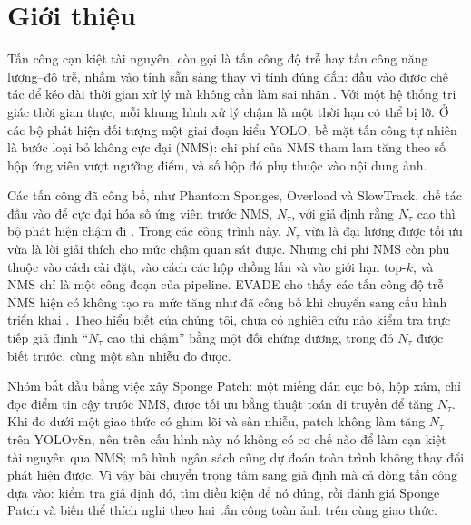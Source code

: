 \documentclass[a4paper,fleqn]{cas-dc}
\newcommand{\Ntau}{N_{\tau}}
\begin{document}
\section{Giới thiệu}
Tấn công cạn kiệt tài nguyên, còn gọi là tấn công độ trễ hay tấn công năng lượng--độ trễ, nhắm vào tính sẵn sàng thay vì tính đúng đắn: đầu vào được chế tác để kéo dài thời gian xử lý mà không cần làm sai nhãn \cite{shumailov2021sponge,nicgslowdown2022}. Với một hệ thống tri giác thời gian thực, mỗi khung hình xử lý chậm là một thời hạn có thể bị lỡ. Ở các bộ phát hiện đối tượng một giai đoạn kiểu YOLO, bề mặt tấn công tự nhiên là bước loại bỏ không cực đại (NMS): chi phí của NMS tham lam tăng theo số hộp ứng viên vượt ngưỡng điểm, và số hộp đó phụ thuộc vào nội dung ảnh.

Các tấn công đã công bố, như Phantom Sponges, Overload và SlowTrack, chế tác đầu vào để cực đại hóa số ứng viên trước NMS, $\Ntau$, với giả định rằng $\Ntau$ cao thì bộ phát hiện chậm đi \cite{phantom2023,overload2024,slowtrack2024}. Trong các công trình này, $\Ntau$ vừa là đại lượng được tối ưu vừa là lời giải thích cho mức chậm quan sát được. Nhưng chi phí NMS còn phụ thuộc vào cách cài đặt, vào cách các hộp chồng lấn và vào giới hạn top-$k$, và NMS chỉ là một công đoạn của pipeline. EVADE cho thấy các tấn công độ trễ NMS hiện có không tạo ra mức tăng như đã công bố khi chuyển sang cấu hình triển khai \cite{evade2025}. Theo hiểu biết của chúng tôi, chưa có nghiên cứu nào kiểm tra trực tiếp giả định ``$\Ntau$ cao thì chậm'' bằng một đối chứng dương, trong đó $\Ntau$ được biết trước, cùng một sàn nhiễu đo được.

Nhóm bắt đầu bằng việc xây Sponge Patch: một miếng dán cục bộ, hộp xám, chỉ đọc điểm tin cậy trước NMS, được tối ưu bằng thuật toán di truyền để tăng $\Ntau$. Khi đo dưới một giao thức có ghim lõi và sàn nhiễu, patch không làm tăng $\Ntau$ trên YOLOv8n, nên trên cấu hình này nó không có cơ chế nào để làm cạn kiệt tài nguyên qua NMS; mô hình ngân sách cũng dự đoán toàn trình không thay đổi phát hiện được. Vì vậy bài chuyển trọng tâm sang giả định mà cả dòng tấn công dựa vào: kiểm tra giả định đó, tìm điều kiện để nó đúng, rồi đánh giá Sponge Patch và biến thể thích nghi theo hai tấn công toàn ảnh trên cùng giao thức.
\end{document}
